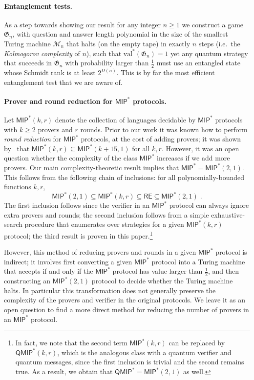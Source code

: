 \documentclass[11pt]{article}
\theoremstyle{definition}
\newcommand{\val}{\ensuremath{\mathrm{val}}}
\newcommand{\game}{\mathfrak{G}}
\newcommand{\class}[1]{\ensuremath{\mathsf{#1}}\xspace}
\newcommand{\QMIP}{\class{QMIP}} %
\newcommand{\MIP}{\class{MIP}} %
\newcommand{\RE}{\class{RE}} %
\renewcommand{\cal}[1]{\mathcal{#1}}
\begin{document}
\paragraph{Entanglement tests.} As a step towards showing our result for any integer $n\geq 1$ we construct a game $\game_n$, with question and answer length polynomial in the size of the smallest Turing machine $\cal{M}_n$ that halts (on the empty tape) in exactly $n$ steps (i.e.\ the \emph{Kolmogorov complexity} of $n$), such that $\val^*(\game_n)=1$ yet any quantum strategy that succeeds in $\game_n$ with probability larger than $\frac{1}{2}$ must use an entangled state whose Schmidt rank is at least $2^{\Omega(n)}$. This is by far the most efficient entanglement test that we are aware of.

\paragraph{Prover and round reduction for $\MIP^*$ protocols.} Let $\MIP^*(k,r)$ denote the collection of languages decidable by $\MIP^*$ protocols with $k\geq 2$ provers and $r$ rounds. Prior to our work it was known how to perform \emph{round reduction} for $\MIP^*$ protocols, at the cost of adding provers; it was shown by~\cite{ji2017compression,fitzsimons2018quantum} that $\MIP^*(k,r) \subseteq \MIP^*(k + 15,1)$ for all $k, r$. However, it was an open question whether the complexity of the class $\MIP^*$ increases if we add more provers.
Our main complexity-theoretic result implies that $\MIP^* = \MIP^*(2,1)$. This follows from the following chain of inclusions: for all polynomially-bounded functions $k,r$,
 \[
 	\MIP^*(2,1) \subseteq \MIP^*(k,r) \subseteq \RE \subseteq \MIP^*(2,1)\;.
\]
The first inclusion follows since the verifier in an $\MIP^*$ protocol can always ignore extra provers and rounds; the second inclusion follows from a simple exhaustive-search procedure that enumerates over strategies for a given $\MIP^*(k,r)$ protocol; the third result is proven in this paper.\footnote{In fact, we note that the second term $\MIP^*(k,r)$ can be replaced by $\QMIP^*(k,r)$, which is the analogous class with a quantum verifier and quantum messages, since the first inclusion is trivial and the second remains true. As a result, we obtain that $\QMIP^* = \MIP^*(2,1)$ as well.}

However, this method of reducing provers and rounds in a given $\MIP^*$ protocol is indirect; it involves first converting a given $\MIP^*$ protocol into a Turing machine that accepts if and only if the $\MIP^*$ protocol has value larger than $\frac{1}{2}$, and then constructing an $\MIP^*(2,1)$ protocol to decide whether the Turing machine halts. In particular this transformation does not generally preserve the complexity of the provers and verifier in the original protocols. We leave it as an open question to find a more direct method for reducing the number of provers in an $\MIP^*$ protocol.
\end{document}
